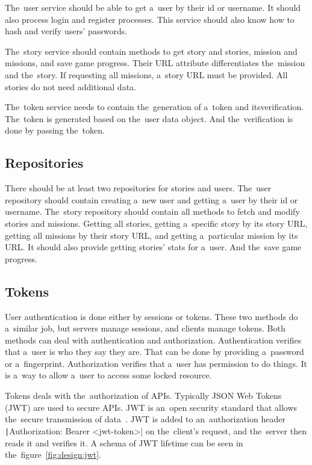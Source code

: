 The~user service should be able to get a~user by their id or username.
\linebreak
It should also process login and register processes.
This service should also know how to hash and verify users' passwords.

The~story service should contain methods to get story and stories, mission and missions, and save game progress.
Their URL attribute differentiates the~mission and the~story.
If requesting all missions, a~story URL must be provided.
All stories do not need additional data.

The~token service needs to contain the~generation of a~token and its\linebreak{}verification.
The~token is generated based on the~user data object.
And the~verification is done by passing the~token.

\subsection{Repositories}

There should be at least two repositories for stories and users.
The~user repository should contain creating a~new user and getting a~user by their id or username.
The~story repository should contain all methods to fetch and modify stories and missions.
Getting all stories, getting a~specific story by its story URL, getting all missions by their story URL, and getting a~particular mission by its URL.
It should also provide getting stories' stats for a~user.
And the~save game progress.

\subsection{Tokens}
\label{design:server:tokens}

User authentication is done either by sessions or tokens.
These two methods do a~similar job, but servers manage sessions, and clients manage tokens.
Both methods can deal with authentication and authorization.
Authentication verifies that a~user is who they say they are.
That can be done by providing a~password or a~fingerprint.
Authorization verifies that a~user has permission to do things.
It is a~way to allow a~user to access some locked resource.~\cite{lin_2018_tuck}

Tokens deals with the~authorization of APIs.
Typically JSON Web Tokens (JWT) are used to secure APIs.
JWT is an~open security standard that allows the~secure transmission of data~\cite{lin_2018_tuck}.
JWT is added to an~authorization header \texttt|Authorization: Bearer <jwt-token>| on the~client's request, and the~server then reads it and verifies it.
A schema of JWT lifetime can be seen in the~figure~\ref{fig:design:jwt}.

